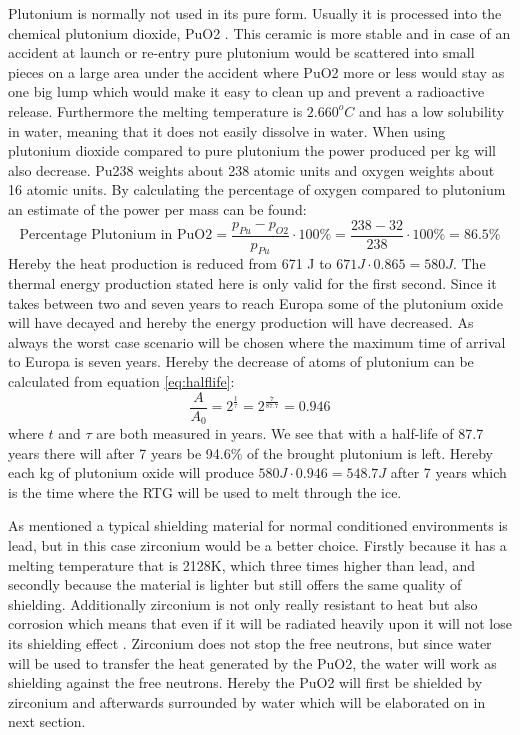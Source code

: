 \noindent
Plutonium is normally not used in its pure form. Usually it is processed into the chemical plutonium dioxide, PuO2 \cite{website:plutoniumoxide}. This ceramic is more stable and in case of an accident at launch or re-entry pure plutonium would be scattered into small pieces on a large area under the accident where PuO2 more or less would stay as one big lump which would make it easy to clean up and prevent a radioactive release. Furthermore the melting temperature is $2.660^oC$ and has a low solubility in water, meaning that it does not easily dissolve in water. When using plutonium dioxide compared to pure plutonium the power produced per kg will also decrease. Pu238 weights about 238 atomic units and oxygen weights about 16 atomic units. By calculating the percentage of oxygen compared to plutonium an estimate of the power per mass can be found: 
\begin{equation*}
\text{Percentage Plutonium in PuO2} = \frac{p_{Pu} - p_{O2}}{p_{Pu}}\cdot 100\% = \frac{238 - 32}{238}\cdot 100\% = 86.5\% 
\end{equation*}
Hereby the heat production is reduced from 671 J to $671J \cdot 0.865 = 580J$. The thermal energy production stated here is only valid for the first second. Since it takes between two and seven years to reach Europa some of the plutonium oxide will have decayed and hereby the energy production will have decreased. As always the worst case scenario will be chosen where the maximum time of arrival to Europa is seven years. Hereby the decrease of atoms of plutonium can be calculated from equation \ref{eq:halflife}: 
\begin{equation}
\frac{A}{A_0} = 2^{\frac{t}{\tau}} = 2^{\frac{7}{87.7}} = 0.946
\end{equation}
where  $t$ and $\tau$ are both measured in years. We see that with a half-life of 87.7 years there will after 7 years be 94.6\% of the brought plutonium is left. Hereby each kg of plutonium oxide will produce $580J \cdot 0.946 = 548.7J$ after 7 years which is the time where the RTG will be used to melt through the ice.

 \label{sec:shielding}
As mentioned a typical shielding material for normal conditioned environments is lead, but in this case zirconium would be a better choice. Firstly because it has a melting temperature that is 2128K, which three times higher than lead, and secondly because the material is lighter but still offers the same quality of shielding. Additionally zirconium is not only really resistant to heat but also corrosion which means that even if it will be radiated heavily upon it will not lose its shielding effect \cite{website:zirc}. Zirconium does not stop the free neutrons, but since water will be used to transfer the heat generated by the PuO2, the water will work as shielding against the free neutrons. Hereby the PuO2 will first be shielded by zirconium and afterwards surrounded by water which will be elaborated on in next section.

